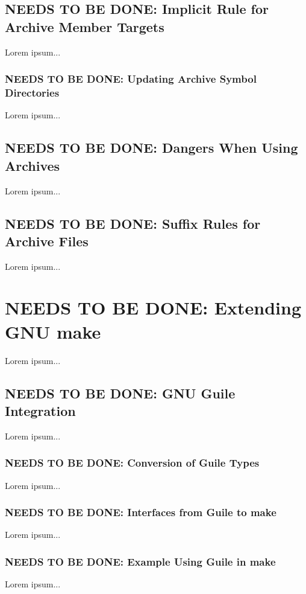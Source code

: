 \documentclass{charun}
\begin{document}
\begin{multicols*}{2}
\color{gray}
\subsection{NEEDS TO BE DONE: Implicit Rule for Archive Member Targets}
Lorem ipsum...
\color{black}

\color{gray}
\subsubsection{NEEDS TO BE DONE: Updating Archive Symbol Directories}
Lorem ipsum...
\color{black}

\color{gray}
\subsection{NEEDS TO BE DONE: Dangers When Using Archives}
Lorem ipsum...
\color{black}

\color{gray}
\subsection{NEEDS TO BE DONE: Suffix Rules for Archive Files}
Lorem ipsum...
\color{black}


\color{gray}
\section{NEEDS TO BE DONE: Extending GNU make}
Lorem ipsum...
\color{black}


\color{gray}
\subsection{NEEDS TO BE DONE: GNU Guile Integration}
Lorem ipsum...
\color{black}

\color{gray}
\subsubsection{NEEDS TO BE DONE: Conversion of Guile Types}
Lorem ipsum...
\color{black}

\color{gray}
\subsubsection{NEEDS TO BE DONE: Interfaces from Guile to make}
Lorem ipsum...
\color{black}

\color{gray}
\subsubsection{NEEDS TO BE DONE: Example Using Guile in make}
Lorem ipsum...
\color{black}


\end{multicols*}
\end{document}
